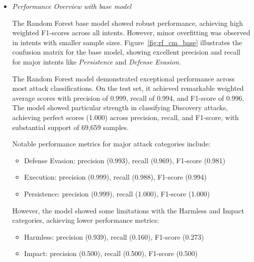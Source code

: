             \begin{itemize}
        
                \item \textit{Performance Overview with base model}
                
                    \vspace{0.3em}


                    The Random Forest base model showed robust performance, achieving high weighted F1-scores across all intents. However, minor overfitting was observed in intents with smaller sample sizes. Figure~\ref{fig:rf_cm_base} illustrates the confusion matrix for the base model, showing excellent precision and recall for major intents like \textit{Persistence} and \textit{Defense Evasion}.
                    
                    The Random Forest model demonstrated exceptional performance across most attack classifications. On the test set, it achieved remarkable weighted average scores with precision of 0.999, recall of 0.994, and F1-score of 0.996. The model showed particular strength in classifying Discovery attacks, achieving perfect scores (1.000) across precision, recall, and F1-score, with substantial support of 69,659 samples.
            
            
                    Notable performance metrics for major attack categories include:
                    \begin{itemize}
                        \item Defense Evasion: precision (0.993), recall (0.969), F1-score (0.981)
                        \item Execution: precision (0.999), recall (0.988), F1-score (0.994)
                        \item Persistence: precision (0.999), recall (1.000), F1-score (1.000)
                    \end{itemize}

                    However, the model showed some limitations with the Harmless and Impact categories, achieving lower performance metrics:
                    \begin{itemize}
                        \item Harmless: precision (0.939), recall (0.160), F1-score (0.273)
                        \item Impact: precision (0.500), recall (0.500), F1-score (0.500)
                    \end{itemize}
                    

\end{itemize}
